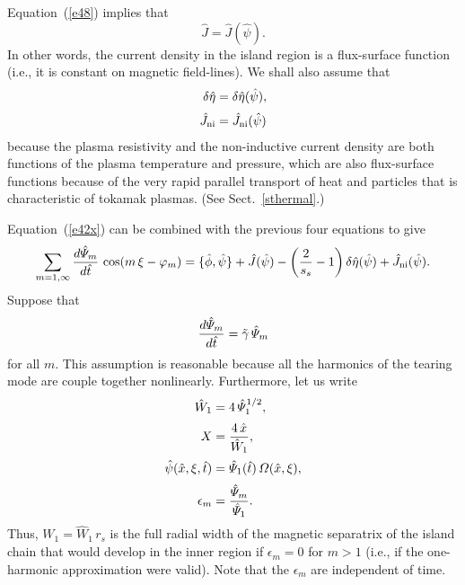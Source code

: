\documentclass[12pt,prb,aps]{revtex4-1}
\begin{document}
Equation~(\ref{e48}) implies that
\begin{equation}
\hat{J}= \hat{J}(\hat{\psi}).
\end{equation}
In other words, the current density in the island region is a flux-surface function (i.e., it is constant on magnetic field-lines). We shall also assume that
\begin{align}
\delta\hat{\eta}  &= \delta\hat{\eta}(\hat{\psi}),\\[0.5ex]
\hat{J}_{\rm ni} &= \hat{J}_{\rm ni}(\hat{\psi})
\end{align}
because the plasma resistivity and the non-inductive current density are both functions of the plasma temperature and pressure, which are also flux-surface functions because of the very rapid parallel transport of heat and particles that is characteristic of tokamak plasmas. (See Sect.~\ref{sthermal}.)

Equation~(\ref{e42x}) can be combined with the previous four equations to give
\begin{equation}\label{e41x}
\sum_{m=1,\infty}\frac{d\hat{\mit\Psi}_m}{d\hat{t}}\,\cos(m\,\xi-\varphi_m) = \{\hat{\phi},\hat{\psi}\}
+\hat{J}(\hat{\psi}) -\left(\frac{2}{s_s}-1\right)
\delta\hat{\eta}(\hat{\psi}) + \hat{J}_{\rm ni}(\hat{\psi}).
\end{equation}
Suppose that 
\begin{equation}\label{e42}
\frac{d\hat{\mit\Psi}_m}{d\hat{t}}=\tilde{\gamma}\,\hat{\mit\Psi}_m
\end{equation}
for all $m$. This assumption is reasonable because all  the harmonics of the tearing mode are couple together nonlinearly. Furthermore, let us write
\begin{align}
\hat{W}_1 &= 4\,\hat{\mit\Psi}_1^{1/2},\label{e43}\\[0.5ex]
X &= \frac{4\,\hat{x}}{\hat{W}_1},\label{e44}\\[0.5ex]
\hat{\psi}(\hat{x},\xi,\hat{t}) &= \hat{\mit\Psi}_1(\hat{t})\,{\mit\Omega}(\hat{x},\xi),\\[0.5ex]
\epsilon_m &= \frac{\hat{\mit\Psi}_m}{\hat{\mit\Psi}_1}.\label{e46}
\end{align}
Thus, $W_1=\hat{W}_1\,r_s$ is the full radial width of the magnetic separatrix of the island chain that would develop in the inner region if $\epsilon_m=0$ for $m>1$ (i.e., if the one-harmonic approximation were valid).  Note that the $\epsilon_m$ are independent of time. 
\end{document}
